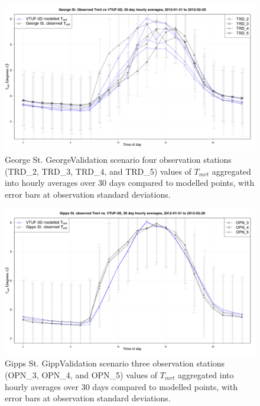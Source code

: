 \documentclass[final,3p,times,authoryear]{elsarticle}
\begin{document}
\begin{figure}[!htbp]
\includegraphics[trim = 0mm 0mm 0mm 0mm, clip, scale=0.32]{images/GeorgeValidationTmrtOverallAve5_.png}
\caption{George St. GeorgeValidation scenario four observation stations (TRD\_2, TRD\_3, TRD\_4, and TRD\_5) values of $T_{mrt}$ aggregated into hourly averages over 30 days compared to modelled points, with error bars at observation standard deviations.\label{fig:GeorgeSt30Compare}} 
\end{figure}

\begin{figure}[!htbp]
\includegraphics[trim = 0mm 0mm 0mm 0mm, clip, scale=0.32]{images/GippValidationTmrtOverallAve5_.png}
\caption{Gipps St. GippValidation scenario three observation stations (OPN\_3, OPN\_4, and OPN\_5) values of $T_{mrt}$ aggregated into hourly averages over 30 days compared to modelled points, with error bars at observation standard deviations.\label{fig:GippsSt30Compare}}
\end{figure}
\end{document}
